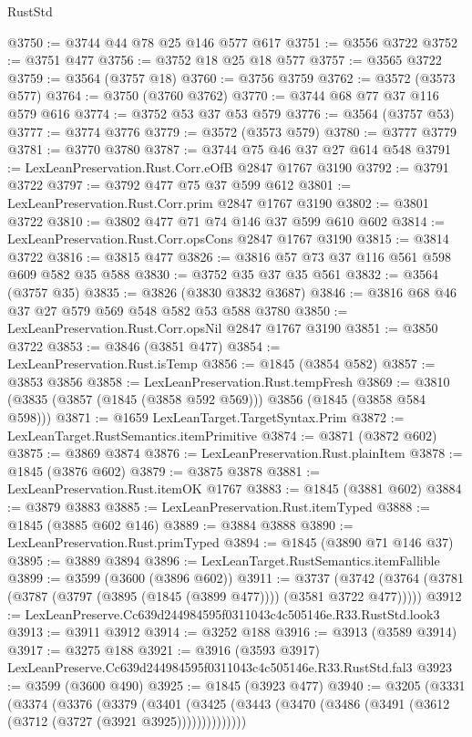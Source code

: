 \begin{lexlean}{RustStd}
\begin{coremodule}
@3750 := @3744 @44 @78 @25 @146 @577 @617
@3751 := @3556 @3722
@3752 := @3751 @477
@3756 := @3752 @18 @25 @18 @577
@3757 := @3565 @3722
@3759 := @3564 (@3757 @18)
@3760 := @3756 @3759
@3762 := @3572 (@3573 @577)
@3764 := @3750 (@3760 @3762)
@3770 := @3744 @68 @77 @37 @116 @579 @616
@3774 := @3752 @53 @37 @53 @579
@3776 := @3564 (@3757 @53)
@3777 := @3774 @3776
@3779 := @3572 (@3573 @579)
@3780 := @3777 @3779
@3781 := @3770 @3780
@3787 := @3744 @75 @46 @37 @27 @614 @548
@3791 := LexLeanPreservation.Rust.Corr.eOfB @2847 @1767 @3190
@3792 := @3791 @3722
@3797 := @3792 @477 @75 @37 @599 @612
@3801 := LexLeanPreservation.Rust.Corr.prim @2847 @1767 @3190
@3802 := @3801 @3722
@3810 := @3802 @477 @71 @74 @146 @37 @599 @610 @602
@3814 := LexLeanPreservation.Rust.Corr.opsCons @2847 @1767 @3190
@3815 := @3814 @3722
@3816 := @3815 @477
@3826 := @3816 @57 @73 @37 @116 @561 @598 @609 @582 @35 @588
@3830 := @3752 @35 @37 @35 @561
@3832 := @3564 (@3757 @35)
@3835 := @3826 (@3830 @3832 @3687)
@3846 := @3816 @68 @46 @37 @27 @579 @569 @548 @582 @53 @588 @3780
@3850 := LexLeanPreservation.Rust.Corr.opsNil @2847 @1767 @3190
@3851 := @3850 @3722
@3853 := @3846 (@3851 @477)
@3854 := LexLeanPreservation.Rust.isTemp
@3856 := @1845 (@3854 @582)
@3857 := @3853 @3856
@3858 := LexLeanPreservation.Rust.tempFresh
@3869 := @3810 (@3835 (@3857 (@1845 (@3858 @592 @569))) @3856 (@1845 (@3858 @584 @598)))
@3871 := @1659 LexLeanTarget.TargetSyntax.Prim
@3872 := LexLeanTarget.RustSemantics.itemPrimitive
@3874 := @3871 (@3872 @602)
@3875 := @3869 @3874
@3876 := LexLeanPreservation.Rust.plainItem
@3878 := @1845 (@3876 @602)
@3879 := @3875 @3878
@3881 := LexLeanPreservation.Rust.itemOK @1767
@3883 := @1845 (@3881 @602)
@3884 := @3879 @3883
@3885 := LexLeanPreservation.Rust.itemTyped
@3888 := @1845 (@3885 @602 @146)
@3889 := @3884 @3888
@3890 := LexLeanPreservation.Rust.primTyped
@3894 := @1845 (@3890 @71 @146 @37)
@3895 := @3889 @3894
@3896 := LexLeanTarget.RustSemantics.itemFallible
@3899 := @3599 (@3600 (@3896 @602))
@3911 := @3737
    (@3742 (@3764 (@3781 (@3787 (@3797 (@3895 (@1845 (@3899 @477)))) (@3581 @3722 @477)))))
@3912 := LexLeanPreserve.Cc639d244984595f0311043c4c505146e.R33.RustStd.look3
@3913 := @3911 @3912
@3914 := @3252 @188
@3916 := @3913 (@3589 @3914)
@3917 := @3275 @188
@3921 := @3916 (@3593 @3917) LexLeanPreserve.Cc639d244984595f0311043c4c505146e.R33.RustStd.fal3
@3923 := @3599 (@3600 @490)
@3925 := @1845 (@3923 @477)
@3940 := @3205
    (@3331
      (@3374
        (@3376
          (@3379
            (@3401
              (@3425 (@3443 (@3470 (@3486 (@3491 (@3612 (@3712 (@3727 (@3921 @3925))))))))))))))

\end{coremodule}
\end{lexlean}
